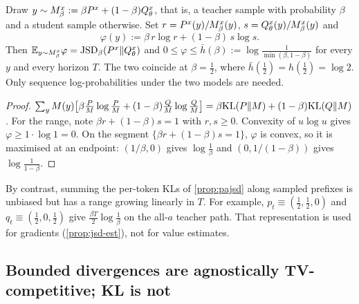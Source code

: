 \begin{proposition}\label{prop:mix-est}
\Pv\Ck Draw $y\sim M^x_\beta:=\beta P^{x}+(1-\beta)Q^{x}_{\theta}$, that is, a teacher sample with probability $\beta$ and a
student sample otherwise. Set $r=P^{x}(y)/M^x_\beta(y)$, $s=Q^{x}_{\theta}(y)/M^x_\beta(y)$ and
\[
\varphi(y):=\beta\,r\log r+(1-\beta)\,s\log s .
\]
Then $\mathbb{E}_{y\sim M^x_\beta}\varphi=\mathrm{JSD}_\beta(P^{x}\|Q^{x}_{\theta})$ and $0\le\varphi\le\bar h(\beta):=\log\frac1{\min(\beta,1-\beta)}$ for every $y$
and every horizon $T$. The two coincide at $\beta=\frac12$, where $\bar h(\frac12)=h(\frac12)=\log2$. Only sequence
log-probabilities under the two models are needed.
\end{proposition}
\begin{proof}
$\sum_yM(y)\big[\beta\frac PM\log\frac PM+(1-\beta)\frac QM\log\frac QM\big]=\beta\mathrm{KL}(P\|M)+(1-\beta)\mathrm{KL}(Q\|M)$. For the range, note
$\beta r+(1-\beta)s=1$ with $r,s\ge0$. Convexity of $u\log u$ gives $\varphi\ge1\cdot\log1=0$. On the segment
$\{\beta r+(1-\beta)s=1\}$, $\varphi$ is convex, so it is maximised at an endpoint: $(1/\beta,0)$ gives
$\log\frac1\beta$ and $(0,1/(1-\beta))$ gives $\log\frac1{1-\beta}$.
\end{proof}
\noindent
By contrast, summing the per-token KLs of \cref{prop:pajsd} along sampled prefixes is unbiased but has a
range growing linearly in $T$. For example, $p_t\equiv(\frac12,\frac12,0)$ and $q_t\equiv(\frac12,0,\frac12)$ give
$\frac{\beta T}2\log\frac1\beta$ on the all-$a$ teacher path. That representation is used for gradients
(\cref{prop:jsd-est}), not for value estimates.

\subsection{Bounded divergences are agnostically TV-competitive; KL is not}

